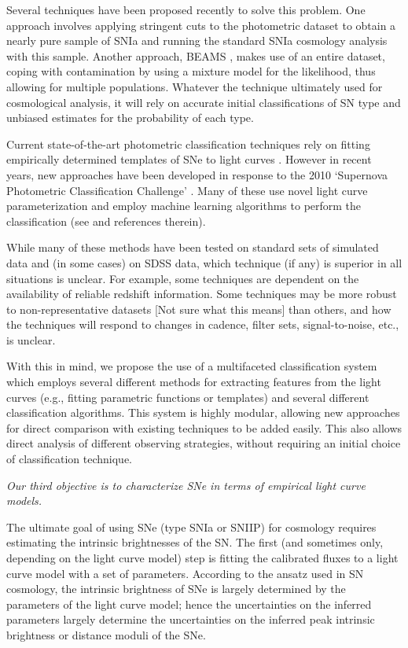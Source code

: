 Several techniques have been proposed recently to solve this problem. One 
approach involves applying stringent cuts to the photometric dataset to obtain a nearly pure sample 
of SNIa\citep{Bernstein2012,Campbell2013} and running the standard SNIa cosmology analysis 
with this sample. Another approach, BEAMS \citep{Kunz2007,Newling2011,Hlozek2012,Knights2013}, 
makes use of an entire dataset, coping with contamination by using a mixture model for the 
likelihood, thus allowing for multiple populations. Whatever the technique ultimately used for 
cosmological analysis, it will rely on accurate initial classifications of SN type and 
unbiased estimates for the probability of each type.

Current state-of-the-art photometric classification techniques rely on fitting empirically 
determined templates of SNe to light curves \citep{Jha2007,Guy2007,Sako2011}. However in 
recent years, new approaches have been developed in response to the 2010 `Supernova 
Photometric Classification Challenge' \citep{Kessler2010a}. Many of these use novel light curve 
parameterization and employ machine learning algorithms to perform the classification (see \citet{Kessler2010b} and references therein).

While many of these methods have been tested on standard sets of simulated data and (in some cases) 
on SDSS data, which technique (if any) is superior in all situations is unclear. For 
example, some techniques are dependent on the availability of reliable redshift information. 
Some techniques may be more robust to non-representative datasets [Not sure what this means] than 
others, and how the techniques will respond to changes in cadence, filter sets, signal-to-noise, 
etc., is unclear.  

With this in mind, we propose the use of a multifaceted classification system which employs 
several different methods for extracting features from the light curves (e.g., fitting parametric 
functions or templates) and several different classification algorithms. This system is highly 
modular, allowing new approaches for direct comparison with existing  techniques to be added easily. This also allows direct analysis of different observing strategies, without requiring 
an initial choice of classification technique. 


{\emph{Our third objective is to characterize SNe in terms of empirical
    light curve models.}}

The ultimate goal of using SNe (type SNIa or SNIIP) for cosmology requires estimating the intrinsic brightnesses of the SN. The
first (and sometimes only, depending on the light curve model) step is
fitting the calibrated fluxes to a light curve model with a set of parameters.
According to the ansatz used in SN cosmology, the intrinsic brightness of
 SNe is largely determined by the parameters of the light curve model; 
 hence the uncertainties on the inferred parameters largely determine the
 uncertainties on the inferred peak intrinsic brightness or distance moduli of the SNe.

